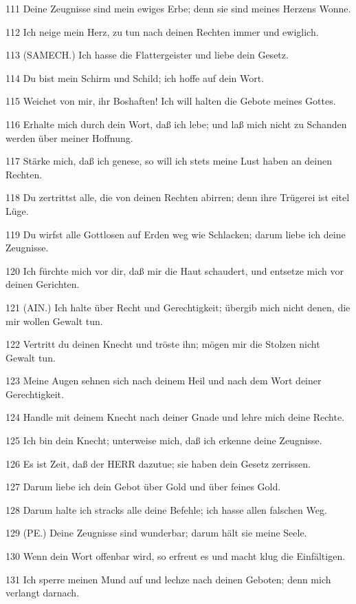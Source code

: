 \par 111 Deine Zeugnisse sind mein ewiges Erbe; denn sie sind meines Herzens Wonne.
\par 112 Ich neige mein Herz, zu tun nach deinen Rechten immer und ewiglich.
\par 113 (SAMECH.) Ich hasse die Flattergeister und liebe dein Gesetz.
\par 114 Du bist mein Schirm und Schild; ich hoffe auf dein Wort.
\par 115 Weichet von mir, ihr Boshaften! Ich will halten die Gebote meines Gottes.
\par 116 Erhalte mich durch dein Wort, daß ich lebe; und laß mich nicht zu Schanden werden über meiner Hoffnung.
\par 117 Stärke mich, daß ich genese, so will ich stets meine Lust haben an deinen Rechten.
\par 118 Du zertrittst alle, die von deinen Rechten abirren; denn ihre Trügerei ist eitel Lüge.
\par 119 Du wirfst alle Gottlosen auf Erden weg wie Schlacken; darum liebe ich deine Zeugnisse.
\par 120 Ich fürchte mich vor dir, daß mir die Haut schaudert, und entsetze mich vor deinen Gerichten.
\par 121 (AIN.) Ich halte über Recht und Gerechtigkeit; übergib mich nicht denen, die mir wollen Gewalt tun.
\par 122 Vertritt du deinen Knecht und tröste ihn; mögen mir die Stolzen nicht Gewalt tun.
\par 123 Meine Augen sehnen sich nach deinem Heil und nach dem Wort deiner Gerechtigkeit.
\par 124 Handle mit deinem Knecht nach deiner Gnade und lehre mich deine Rechte.
\par 125 Ich bin dein Knecht; unterweise mich, daß ich erkenne deine Zeugnisse.
\par 126 Es ist Zeit, daß der HERR dazutue; sie haben dein Gesetz zerrissen.
\par 127 Darum liebe ich dein Gebot über Gold und über feines Gold.
\par 128 Darum halte ich stracks alle deine Befehle; ich hasse allen falschen Weg.
\par 129 (PE.) Deine Zeugnisse sind wunderbar; darum hält sie meine Seele.
\par 130 Wenn dein Wort offenbar wird, so erfreut es und macht klug die Einfältigen.
\par 131 Ich sperre meinen Mund auf und lechze nach deinen Geboten; denn mich verlangt darnach.

